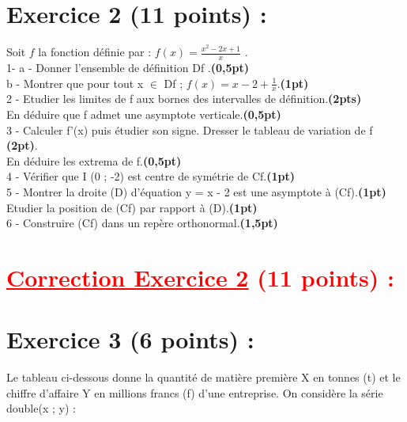 \documentclass[12pt]{article}
\begin{document}
\section*{Exercice 2 (11 points) :}
Soit  $f$  la fonction définie par : $f(x) =\frac{x^{2}-2x+1}{x}$ .\\
    1- a - Donner  l’ensemble de définition  Df .\textbf{(0,5pt)}\\
b - Montrer que pour tout x $\in$ Df ; $f(x) =x-2+\frac{1}{x} $.\textbf{(1pt)}\\
       2  - Etudier les limites de f aux bornes des intervalles de définition.\textbf{(2pts)}\\ 
              En déduire que f admet une asymptote verticale.\textbf{(0,5pt)}\\
       3 - Calculer  f'(x) puis étudier son signe. Dresser le tableau de variation de f \textbf{(2pt)}.\\
             En déduire les extrema  de f.\textbf{(0,5pt)}\\
        4 - Vérifier que  I (0 ; -2) est centre de symétrie de Cf.\textbf{(1pt)} \\
        5 -  Montrer la droite (D) d’équation  y = x - 2  est une asymptote à (Cf).\textbf{(1pt)} \\
             Etudier la position de (Cf) par rapport à (D).\textbf{(1pt)}\\
         6 - Construire (Cf) dans un repère orthonormal.\textbf{(1,5pt)}\\
\section*{\textcolor{red}{\underline{Correction Exercice 2} (11 points) :}}
\section*{Exercice 3 (6 points) :}
Le tableau ci-dessous  donne la quantité de matière première X en tonnes (t) et le chiffre d’affaire Y en millions francs (f) d’une entreprise. On considère  la série double(x ; y) :
\end{document}
